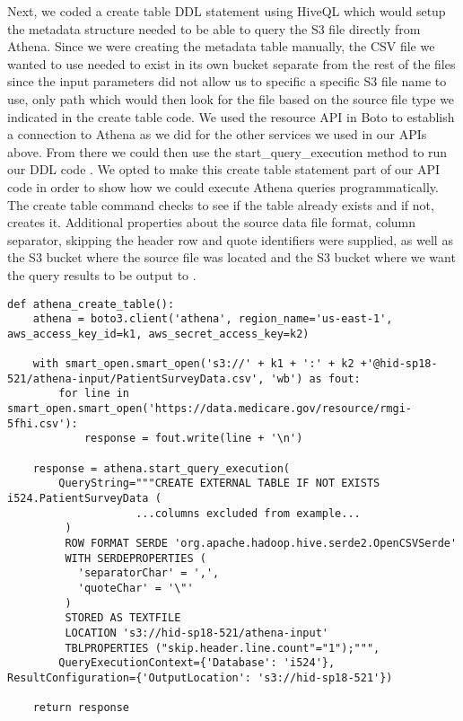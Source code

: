 Next, we coded a create table DDL statement using HiveQL which would setup the metadata structure needed to be able to query the S3 file directly from Athena. Since we were creating the metadata table manually, the CSV file we wanted to use needed to exist in its own bucket separate from the rest of the files since the input parameters did not allow us to specific a specific S3 file name to use, only path which would then look for the file based on the source file type we indicated in the create table code. We used the resource API in Boto to establish a connection to Athena as we did for the other services we used in our APIs above. From there we could then use the start_query_execution method to run our DDL code \cite{hid-sp18-521-boto-athena}. We opted to make this create table statement part of our API code in order to show how we could execute Athena queries programmatically. The create table command checks to see if the table already exists and if not, creates it. Additional properties about the source data file format, column separator, skipping the header row and quote identifiers were supplied, as well as the S3 bucket where the source file was located and the S3 bucket where we want the query results to be output to \cite{hid-sp18-521-athena-gettingstarted}. 

\begin{verbatim}
def athena_create_table():
    athena = boto3.client('athena', region_name='us-east-1', aws_access_key_id=k1, aws_secret_access_key=k2)

    with smart_open.smart_open('s3://' + k1 + ':' + k2 +'@hid-sp18-521/athena-input/PatientSurveyData.csv', 'wb') as fout:
        for line in smart_open.smart_open('https://data.medicare.gov/resource/rmgi-5fhi.csv'):
            response = fout.write(line + '\n')

    response = athena.start_query_execution(
        QueryString="""CREATE EXTERNAL TABLE IF NOT EXISTS i524.PatientSurveyData (
                    ...columns excluded from example...
         )
         ROW FORMAT SERDE 'org.apache.hadoop.hive.serde2.OpenCSVSerde'
         WITH SERDEPROPERTIES (
           'separatorChar' = ',',
           'quoteChar' = '\"'
         )
         STORED AS TEXTFILE 
         LOCATION 's3://hid-sp18-521/athena-input'
         TBLPROPERTIES ("skip.header.line.count"="1");""",
        QueryExecutionContext={'Database': 'i524'}, ResultConfiguration={'OutputLocation': 's3://hid-sp18-521'})

    return response
\end{verbatim}

